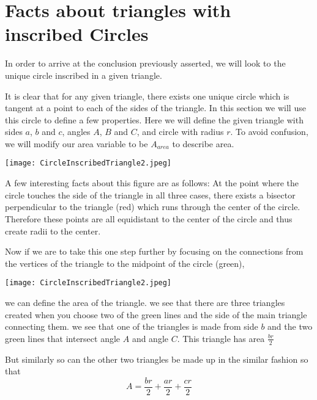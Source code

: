 \documentclass[12pt]{report}
\numberwithin{definition}{section}
\begin{document}
\break

\section{ Facts about triangles with inscribed Circles }

    In order to arrive at the conclusion previously asserted, we will look to the unique circle inscribed in a given triangle.

  


It is clear that for any given triangle, there exists one unique circle which is tangent at a point to each of the sides of the triangle. In this section we will use this circle to define a few properties. Here we will define the given triangle with sides $a$, $b$ and $c$, angles $A$, $B$ and $C$, and circle with radius $r$. To avoid confusion, we will modify our area variable to be $A_{area}$ to describe area. 

   
 
\texttt{[image: CircleInscribedTriangle2.jpeg]}
 
 
   
 
 
	A few interesting facts about this figure are as follows: At the point where the circle touches the side of the triangle in all three cases, there exists a bisector perpendicular to the triangle (red)  which runs through the center of the circle. Therefore these points are all equidistant to the center of the circle and thus create radii to the center. 
	
	Now if we are to take this one step further by focusing on the connections from the vertices of the triangle to the midpoint of the circle (green),  
	
	
  


\texttt{[image: CircleInscribedTriangle2.jpeg]}


  
we can define the area of the triangle. we see that there are three triangles created when you choose two of the green lines and the side of the main triangle connecting them.  we see that one of the triangles is made from side $b$ and the two green lines that intersect angle $A$ and angle $C$. This triangle has area   $ \frac{br}{2}$

	But similarly so can the other two triangles be made up in the similar fashion so that 
\[ A = \frac{br}{2}+ \frac{ar}{2}+ \frac{cr}{2}\]
\end{document}
